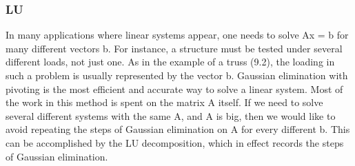 \documentclass{article}
\newcounter{subsubsubsection}[subsubsection]
\begin{document}
\subsubsection{LU}


In many applications where linear systems appear, one needs to solve Ax = b for many different vectors b.
For instance, a structure must be tested under several different loads, not just one. As in the example of a
truss (9.2), the loading in such a problem is usually represented by the vector b. Gaussian elimination with
pivoting is the most efficient and accurate way to solve a linear system. Most of the work in this method is
spent on the matrix A itself. If we need to solve several different systems with the same A, and A is big,
then we would like to avoid repeating the steps of Gaussian elimination on A for every different b. This can
be accomplished by the LU decomposition, which in effect records the steps of Gaussian elimination.



\end{document}
